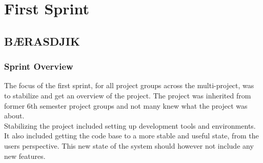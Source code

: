 \part{First Sprint}
\label{par:first_sprint}

\newevenside
\chapter{BÆRASDJIK} %
\label{cha:b_rasdjik}

\section{Sprint Overview}
The focus of the first sprint, for all project groups across the multi-project, was to stabilize and get an overview of the project. The project was inherited from former 6th semester project groups and not many knew what the \giraf project was about.
\\
Stabilizing the project included setting up development tools and environments. It also included getting the code base to a more stable and useful state, from the users perspective. This new state of the system should however not include any new features.







